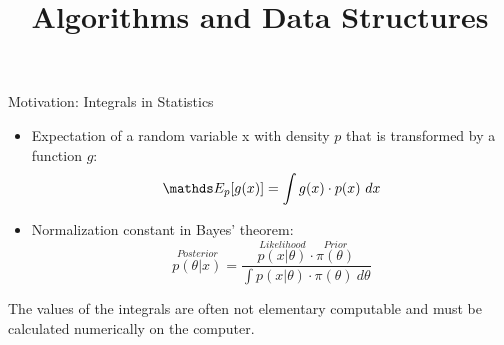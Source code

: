 \documentclass[11pt,compress,t,notes=noshow, xcolor=table]{beamer}
\title{Algorithms and Data Structures}
\begin{document}


% 
% 

\begin{vbframe}{Motivation: Integrals in Statistics}

\begin{itemize}
\item Expectation of a random variable x with density $p$ that is transformed by a function $g$:
$$
\E_p[g(x)] = \int g(x)\cdot p(x)~dx
$$
\item Normalization constant in Bayes' theorem:
$$
\overset{Posterior}{p(\theta | x)} = \frac{\overset{Likelihood}{p(x | \theta)} \cdot \overset{Prior}{\pi(\theta)}}{\int p(x | \theta) \cdot \pi(\theta) ~ d\theta}
$$
\end{itemize}

The values of the integrals are often not elementary computable and must be calculated numerically on the computer.

\end{vbframe}
\end{document}
